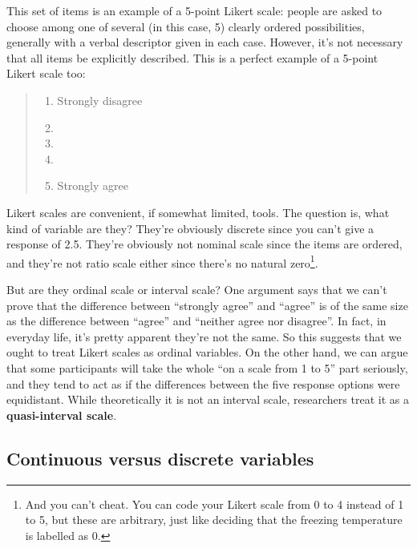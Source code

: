 \documentclass[
  11pt,
]{book}
\providecommand{\tightlist}{%
  \setlength{\itemsep}{0pt}\setlength{\parskip}{0pt}}
\theoremstyle{definition}
\theoremstyle{definition}
\theoremstyle{definition}
\theoremstyle{definition}
\theoremstyle{remark}
\begin{document}
This set of items is an example of a 5-point Likert scale: people are asked to choose among one of several (in this case, 5) clearly ordered possibilities, generally with a verbal descriptor given in each case. However, it's not necessary that all items be explicitly described. This is a perfect example of a 5-point Likert scale too:

\begin{keepTogether}

\begin{quote}
\begin{enumerate}
\def\labelenumi{(\arabic{enumi})}
\tightlist
\item
  Strongly disagree
\item
\item
\item
\item
  Strongly agree
\end{enumerate}
\end{quote}

\end{keepTogether}

Likert scales are convenient, if somewhat limited, tools. The question is, what kind of variable are they? They're obviously discrete since you can't give a response of 2.5. They're obviously not nominal scale since the items are ordered, and they're not ratio scale either since there's no natural zero\footnote{And you can't cheat. You can code your Likert scale from 0 to 4 instead of 1 to 5, but these are arbitrary, just like deciding that the freezing temperature is labelled as 0.}.

But are they ordinal scale or interval scale? One argument says that we can't prove that the difference between ``strongly agree'' and ``agree'' is of the same size as the difference between ``agree'' and ``neither agree nor disagree''. In fact, in everyday life, it's pretty apparent they're not the same. So this suggests that we ought to treat Likert scales as ordinal variables. On the other hand, we can argue that some participants will take the whole ``on a scale from 1 to 5'' part seriously, and they tend to act as if the differences between the five response options were equidistant. While theoretically it is not an interval scale, researchers treat it as a \textbf{quasi-interval scale}.

\hypertarget{continuousdiscrete}{%
\subsection{Continuous versus discrete variables}\label{continuousdiscrete}}
\end{document}
